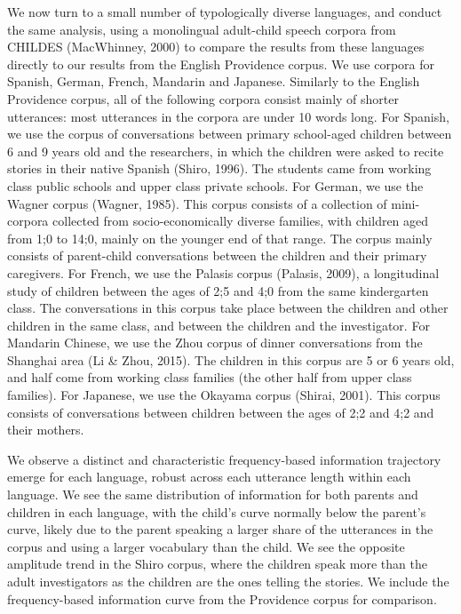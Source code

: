 \documentclass[11pt,]{article}
\begin{document}
We now turn to a small number of typologically diverse languages, and conduct the same analysis, using a monolingual adult-child speech corpora from CHILDES (MacWhinney, 2000) to compare the results from these languages directly to our results from the English Providence corpus. We use corpora for Spanish, German, French, Mandarin and Japanese. Similarly to the English Providence corpus, all of the following corpora consist mainly of shorter utterances: most utterances in the corpora are under 10 words long. For Spanish, we use the corpus of conversations between primary school-aged children between 6 and 9 years old and the researchers, in which the children were asked to recite stories in their native Spanish (Shiro, 1996). The students came from working class public schools and upper class private schools. For German, we use the Wagner corpus (Wagner, 1985). This corpus consists of a collection of mini-corpora collected from socio-economically diverse families, with children aged from 1;0 to 14;0, mainly on the younger end of that range. The corpus mainly consists of parent-child conversations between the children and their primary caregivers. For French, we use the Palasis corpus (Palasis, 2009), a longitudinal study of children between the ages of 2;5 and 4;0 from the same kindergarten class. The conversations in this corpus take place between the children and other children in the same class, and between the children and the investigator. For Mandarin Chinese, we use the Zhou corpus of dinner conversations from the Shanghai area (Li \& Zhou, 2015). The children in this corpus are 5 or 6 years old, and half come from working class families (the other half from upper class families). For Japanese, we use the Okayama corpus (Shirai, 2001). This corpus consists of conversations between children between the ages of 2;2 and 4;2 and their mothers.

We observe a distinct and characteristic frequency-based information trajectory emerge for each language, robust across each utterance length within each language. We see the same distribution of information for both parents and children in each language, with the child's curve normally below the parent's curve, likely due to the parent speaking a larger share of the utterances in the corpus and using a larger vocabulary than the child. We see the opposite amplitude trend in the Shiro corpus, where the children speak more than the adult investigators as the children are the ones telling the stories. We include the frequency-based information curve from the Providence corpus for comparison.
\end{document}
